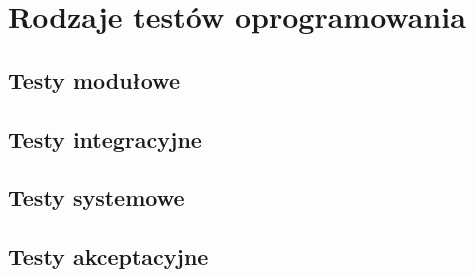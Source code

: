 \chapter{Rodzaje testów oprogramowania}
\label{cha:rodzajetestow}




\section{Testy modułowe}
\label{sec:testyModulowe}





\section{Testy integracyjne}
\label{sec:tesyIntegracyjne}

\section{Testy systemowe}
\label{sec:tesyIntegracyjne}

\section{Testy akceptacyjne}
\label{sec:tesyIntegracyjne}


















